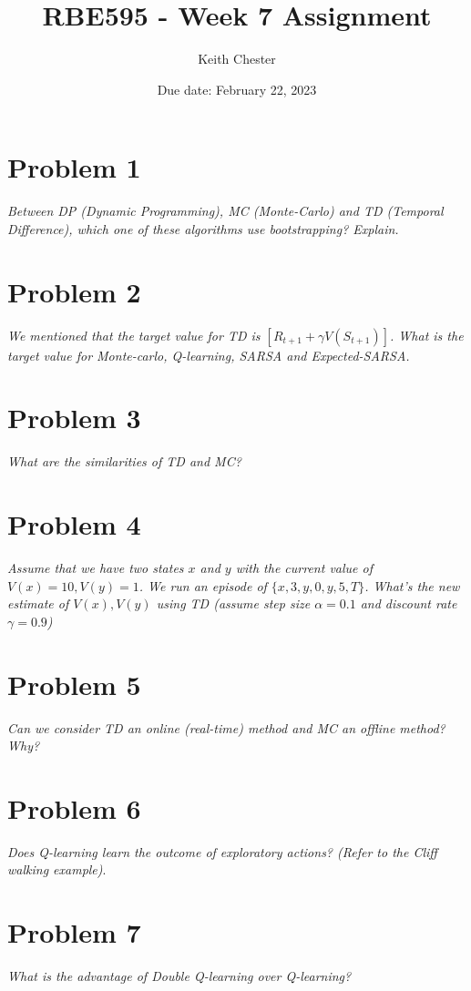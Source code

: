\documentclass{article}
\title{RBE595 - Week 7 Assignment}
\author{Keith Chester}
\date{Due date: February 22, 2023}
\begin{document}
\maketitle

\section*{Problem 1}
\textit{Between DP (Dynamic Programming), MC (Monte-Carlo) and TD (Temporal Difference), which
    one of these algorithms use bootstrapping? Explain. }

\section*{Problem 2}
\textit{We mentioned that the target value for TD is $[R_{t+1} + \gamma V(S_{t+1})]$. What is the target value for Monte-carlo, Q-learning, SARSA and Expected-SARSA.}

\section*{Problem 3}
\textit{What are the similarities of TD and MC?}


\section*{Problem 4}
\textit{Assume that we have two states $x$ and $y$ with the current value of $V(x)=10, V(y)=1$. We run an episode of $\{ x, 3, y, 0, y, 5, T \}$. What’s the new estimate of $V(x),V(y)$ using TD (assume step size $\alpha = 0.1$ and discount rate $\gamma = 0.9$)}


\section*{Problem 5}
\textit{Can we consider TD an online (real-time) method and MC an offline method? Why?}


\section*{Problem 6}
\textit{Does Q-learning learn the outcome of exploratory actions? (Refer to the Cliff walking example)}.

\section*{Problem 7}
\textit{What is the advantage of Double Q-learning over Q-learning?}
\end{document}
